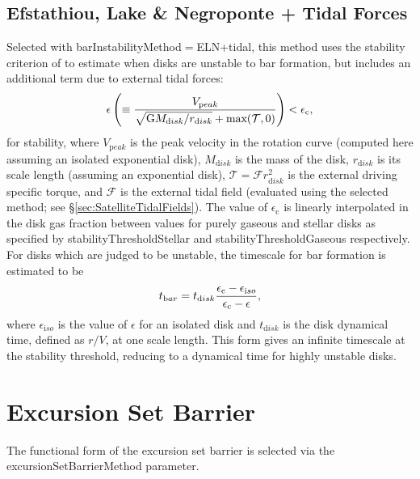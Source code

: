 \subsection{Efstathiou, Lake \& Negroponte + Tidal Forces}

Selected with {\normalfont \ttfamily barInstabilityMethod}$=${\normalfont \ttfamily ELN+tidal}, this method uses the stability criterion of \cite{efstathiou_stability_1982} to estimate when disks are unstable to bar formation, but includes an additional term due to external tidal forces:
\begin{equation}
 \epsilon \left( \equiv {V_{\mathrm peak} \over \sqrt{\G M_{\mathrm disk}/r_{\mathrm disk}} + \hbox{max}(\mathcal{T},0) } \right) < \epsilon_{\mathrm c},
\end{equation}
for stability, where $V_{\mathrm peak}$ is the peak velocity in the rotation curve (computed here assuming an isolated exponential disk), $M_{\mathrm disk}$ is the mass of the disk, $r_{\mathrm disk}$ is its scale length (assuming an exponential disk), $\mathcal{T} = \mathcal{F} r_{\mathrm disk}^2$ is the external driving specific torque, and $\mathcal{F}$ is the external tidal field (evaluated using the selected method; see \S\ref{sec:SatelliteTidalFields}). The value of $\epsilon_{\mathrm c}$ is linearly interpolated in the disk gas fraction between values for purely gaseous and stellar disks as specified by {\normalfont \ttfamily stabilityThresholdStellar} and {\normalfont \ttfamily stabilityThresholdGaseous} respectively. For disks which are judged to be unstable, the timescale for bar formation is estimated to be
\begin{equation}
 t_{\mathrm bar} = t_{\mathrm disk} {\epsilon_{\mathrm c} - \epsilon_{\mathrm iso} \over \epsilon_{\mathrm c} - \epsilon},
\end{equation}
where $\epsilon_{\mathrm iso}$ is the value of $\epsilon$ for an isolated disk and $t_{\mathrm disk}$ is the disk dynamical time, defined as $r/V$, at one scale length. This form gives an infinite timescale at the stability threshold, reducing to a dynamical time for highly unstable disks.

\section{Excursion Set Barrier}

The functional form of the excursion set barrier is selected via the {\normalfont \ttfamily excursionSetBarrierMethod} parameter.

